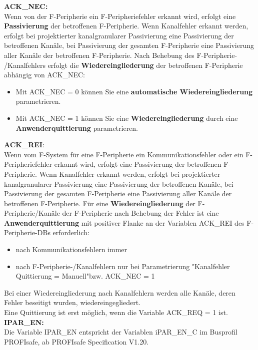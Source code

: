 \textbf{ACK\_NEC:}\\
Wenn von der F-Peripherie ein F-Peripheriefehler erkannt wird, erfolgt eine \textbf{Passivierung} der betroffenen F-Peripherie. Wenn Kanalfehler erkannt werden, erfolgt bei projektierter kanalgranularer Passivierung eine Passivierung der betroffenen Kanäle, bei Passivierung der gesamten F-Peripherie eine Passivierung aller Kanäle der betroffenen F-Peripherie. Nach Behebung des F-Peripherie- /Kanalfehlers erfolgt die \textbf{Wiedereingliederung} der betroffenen F-Peripherie abhängig von ACK\_NEC:
\begin{itemize}
    \item Mit ACK\_NEC = 0 können Sie eine \textbf{automatische Wiedereingliederung} parametrieren.
    \item Mit ACK\_NEC = 1 können Sie eine \textbf{Wiedereingliederung} durch eine \textbf{Anwenderquittierung} parametrieren.
\end{itemize}

\textbf{ACK\_REI}:\\
Wenn vom F-System für eine F-Peripherie ein Kommunikationsfehler oder ein F-Peripheriefehler erkannt wird, erfolgt eine Passivierung der betroffenen F-Peripherie. Wenn Kanalfehler erkannt werden, erfolgt bei projektierter kanalgranularer Passivierung eine Passivierung der betroffenen Kanäle, bei Passivierung der gesamten F-Peripherie eine Passivierung aller Kanäle der betroffenen F-Peripherie. Für eine \textbf{Wiedereingliederung} der F-Peripherie/Kanäle der F-Peripherie nach Behebung der Fehler ist eine \textbf{Anwenderquittierung} mit positiver Flanke an der Variablen ACK\_REI des F-Peripherie-DBs erforderlich:
\begin{itemize}
    \item nach Kommunikationsfehlern immer
    \item nach F-Peripherie-/Kanalfehlern nur bei Parametrierung "Kanalfehler Quittierung = Manuell"\:bzw. ACK\_NEC = 1
\end{itemize}
Bei einer Wiedereingliederung nach Kanalfehlern werden alle Kanäle, deren Fehler beseitigt wurden, wiedereingegliedert.\\
Eine Quittierung ist erst möglich, wenn die Variable ACK\_REQ = 1 ist.\\

\textbf{IPAR_EN:}\\
Die Variable IPAR\_EN entspricht der Variablen iPAR\_EN\_C im Busprofil PROFIsafe, ab PROFIsafe Specification V1.20.\\

